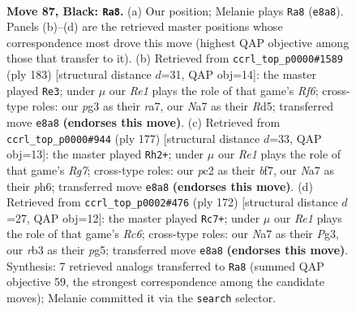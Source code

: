 \documentclass[11pt]{article}
\begin{document}
\clearpage

\begin{figure}[p]\centering
\begin{subfigure}{0.46\textwidth}\centering
\resizebox{\linewidth}{!}{%
\newchessgame
\chessboard[
  setfen={4r3/n7/P2k4/8/8/1R3KPP/2P1B3/8 b - - 8 87},
  showmover=false,
  pgfstyle=straightmove, color=movearrow, markmove={e8-a8}
]}
\caption{}
\end{subfigure}\hfill
\begin{subfigure}{0.46\textwidth}\centering
\resizebox{\linewidth}{!}{%
\newchessgame
\chessboard[
  setfen={2k5/R7/8/3r4/PK6/2B2r2/8/8 b - - 21 92},
  showmover=false,
  pgfstyle=straightmove, color=movearrow, markmove={f3-e3}
]}
\caption{}
\end{subfigure}
\\[4pt]
\begin{subfigure}{0.46\textwidth}\centering
\resizebox{\linewidth}{!}{%
\newchessgame
\chessboard[
  setfen={1r5k/5B2/7P/6P1/2R4K/8/6r1/8 b - - 10 89},
  showmover=false,
  pgfstyle=straightmove, color=movearrow, markmove={g2-h2}
]}
\caption{}
\end{subfigure}\hfill
\begin{subfigure}{0.46\textwidth}\centering
\resizebox{\linewidth}{!}{%
\newchessgame
\chessboard[
  setfen={8/5k2/2R1bp2/6pp/8/6P1/5K2/8 w - - 8 87},
  showmover=false,
  pgfstyle=straightmove, color=movearrow, markmove={c6-c7}
]}
\caption{}
\end{subfigure}
\caption{\textbf{Move 87, Black: \texttt{Ra8}.} (a) Our position; Melanie plays \texttt{Ra8} (\texttt{e8a8}). Panels (b)--(d) are the retrieved master positions whose correspondence most drove this move (highest QAP objective among those that transfer to it). (b) Retrieved from \texttt{ccrl\_top\_p0000\#1589} (ply 183) [structural distance $d$=31, QAP obj=14]: the master played \texttt{Re3}; under $\mu$ our \emph{Re1} plays the role of that game's \emph{Rf6}; cross-type roles: our \emph{p}g3 as their \emph{r}a7, our \emph{N}a7 as their \emph{R}d5; transferred move \texttt{e8a8} \textbf{(endorses this move)}. (c) Retrieved from \texttt{ccrl\_top\_p0000\#944} (ply 177) [structural distance $d$=33, QAP obj=13]: the master played \texttt{Rh2+}; under $\mu$ our \emph{Re1} plays the role of that game's \emph{Rg7}; cross-type roles: our \emph{p}c2 as their \emph{b}f7, our \emph{N}a7 as their \emph{p}h6; transferred move \texttt{e8a8} \textbf{(endorses this move)}. (d) Retrieved from \texttt{ccrl\_top\_p0002\#476} (ply 172) [structural distance $d$=27, QAP obj=12]: the master played \texttt{Rc7+}; under $\mu$ our \emph{Re1} plays the role of that game's \emph{Rc6}; cross-type roles: our \emph{N}a7 as their \emph{P}g3, our \emph{r}b3 as their \emph{p}g5; transferred move \texttt{e8a8} \textbf{(endorses this move)}. Synthesis: 7 retrieved analogs transferred to \texttt{Ra8} (summed QAP objective 59, the strongest correspondence among the candidate moves); Melanie committed it via the \texttt{search} selector.}
\label{fig:thought-m173}
\end{figure}
\end{document}
